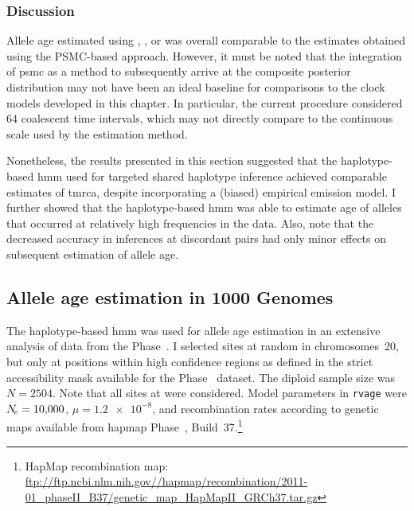 %

%


%
\subsubsection{Discussion}
%

Allele age estimated using \ClockM, \ClockR, or \ClockC was overall comparable to the estimates obtained using the PSMC-based approach.
However, it must be noted that the integration of \gls{psmc} as a method to subsequently arrive at the composite posterior distribution may not have been an ideal baseline for comparisons to the clock models developed in this chapter.
In particular, the current procedure considered 64 coalescent time intervals, which may not directly compare to the continuous scale used by the estimation method.

Nonetheless, the results presented in this section suggested that the haplotype-based \gls{hmm} used for targeted shared haplotype inference achieved comparable estimates of \gls{tmrca}, despite incorporating a (biased) empirical emission model.
I further showed that the haplotype-based \gls{hmm} was able to estimate age of alleles that occurred at relatively high frequencies in the data.
Also, note that the decreased accuracy in inferences at discordant pairs had only minor effects on subsequent estimation of allele age.





%
\subsection{Allele age estimation in 1000 Genomes}\label{sec:hhmm_1kg}
%

The haplotype-based \gls{hmm} was used for allele age estimation in an extensive analysis of data from the  Phase~.
I selected  sites at random in chromosomes~20, but only at positions within high confidence regions as defined in the strict accessibility mask available for the Phase~ dataset.
The diploid sample size was ${N=\num{2504}}$.
Note that all sites at  were considered.
Model parameters in \texttt{rvage} were ${\Ne=\n{10000}}$, ${\mu=\num[round-precision=1]{1.2e-8}}$, and recombination rates according to genetic maps available from \gls{hapmap} Phase~, Build~37.\footnote{HapMap recombination map: \url{ftp://ftp.ncbi.nlm.nih.gov//hapmap/recombination/2011-01_phaseII_B37/genetic_map_HapMapII_GRCh37.tar.gz} }

